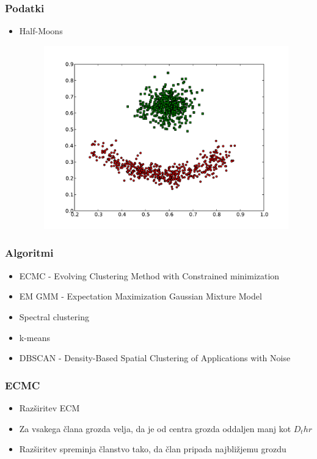 \documentclass{beamer}
\begin{document}
\begin{frame}
\frametitle{Podatki}
    \begin{itemize}
   	\item Half-Moons
    		\begin{figure}[]
    			\includegraphics[scale=0.2]{red-blue-clusters.pdf}
    		\end{figure}
    \end{itemize}
\end{frame}

\begin{frame}
\frametitle{Algoritmi}
    \begin{itemize}
    	\item ECMC - Evolving Clustering Method with Constrained minimization
   	\item EM GMM - Expectation Maximization Gaussian Mixture Model
   	\item Spectral clustering
   	\item k-means 
   	\item DBSCAN - Density-Based Spatial Clustering of Applications with Noise
    \end{itemize}
\end{frame}

\begin{frame}
\frametitle{ECMC}
    \begin{itemize}
    	\item Razširitev ECM
   	\item Za vsakega člana grozda velja, da je od centra grozda oddaljen manj kot $D_thr$
   	\item Razširitev spreminja članstvo tako, da član pripada najbližjemu grozdu
    \end{itemize}
\end{frame}
\end{document}
